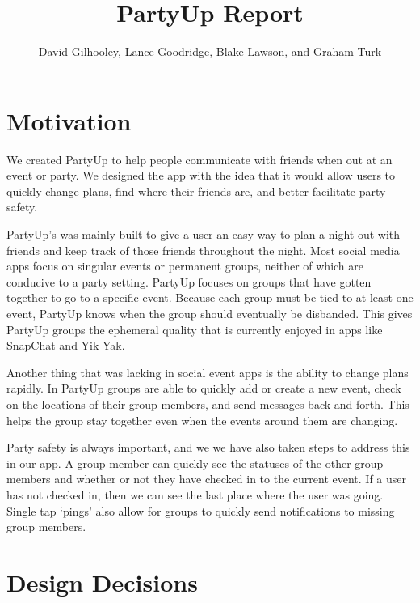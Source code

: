 \documentclass[12pt]{article}
\title{PartyUp Report}
\author{David Gilhooley, Lance Goodridge, Blake Lawson, and Graham Turk}
\begin{document}
\pagestyle{plain}

\maketitle

\section{Motivation} %
\label{sec:Motivation}
We created PartyUp to help people communicate with friends when out at an event or party. We designed the app with the idea that it would allow users to quickly change plans, find where their friends are, and better facilitate party safety.

\bigskip

PartyUp's was mainly built to give a user an easy way to plan a night out with friends and keep track of those friends throughout the night. Most social media apps focus on singular events or permanent groups, neither of which are conducive to a party setting.
PartyUp focuses on groups that have gotten together to go to a specific event. Because each group must be tied to at least one event, PartyUp knows when the group should eventually be disbanded. This gives PartyUp groups the ephemeral quality that is currently enjoyed in apps like SnapChat and Yik Yak.

\bigskip

Another thing that was lacking in social event apps is the ability to change plans rapidly. In PartyUp groups are able to quickly add or create a new event, check on the locations of their group-members, and send messages back and forth. This helps the group stay together even when the events around them are changing. 

\bigskip

Party safety is always important, and we we have also taken steps to address this in our app. A group member can quickly see the statuses of the other group members and whether or not they have checked in to the current event. If a user has not checked in, then we can see the last place where the user was going. Single tap `pings' also allow for groups to quickly send notifications to missing group members.

\section{Design Decisions} %
\label{sec:design_decisions}
\end{document}

